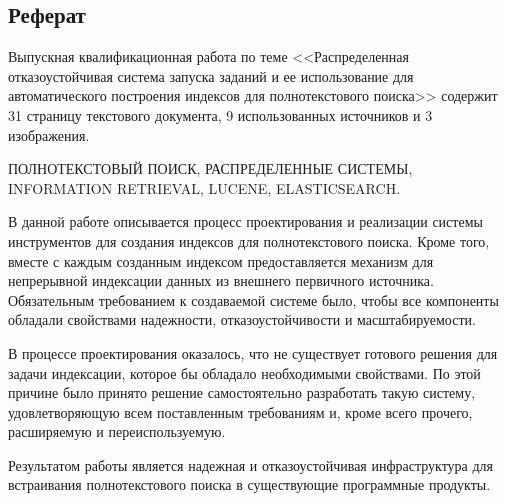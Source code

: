 \begin{center}
	\section*{Реферат}
\end{center}

Выпускная квалификационная работа по теме <<Распределенная отказоустойчивая система запуска заданий и ее использование для автоматического построения индексов для полнотекстового поиска>> содержит 31 страницу текстового документа, 9 использованных источников и 3 изображения.

ПОЛНОТЕКСТОВЫЙ ПОИСК, РАСПРЕДЕЛЕННЫЕ СИСТЕМЫ, INFORMATION RETRIEVAL, LUCENE, ELASTICSEARCH.

В данной работе описывается процесс проектирования и реализации системы инструментов для создания индексов  для полнотекстового поиска. Кроме того, вместе с каждым созданным индексом предоставляется механизм для непрерывной индексации данных из внешнего первичного источника. Обязательным требованием к создаваемой системе было, чтобы все компоненты обладали свойствами надежности, отказоустойчивости и масштабируемости.

В процессе проектирования оказалось, что не существует готового решения для задачи индексации, которое бы обладало необходимыми свойствами. По этой причине было принято решение самостоятельно разработать такую систему, удовлетворяющую всем поставленным требованиям и, кроме всего прочего, расширяемую и переиспользуемую.

Результатом работы является надежная и отказоустойчивая инфраструктура для встраивания полнотекстового поиска в существующие программные продукты.


\clearpage

